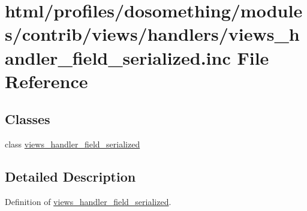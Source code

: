 \hypertarget{views__handler__field__serialized_8inc}{
\section{html/profiles/dosomething/modules/contrib/views/handlers/views\_\-handler\_\-field\_\-serialized.inc File Reference}
\label{views__handler__field__serialized_8inc}
}
\subsection*{Classes}
\begin{DoxyCompactItemize}
\item 
class \hyperlink{classviews__handler__field__serialized}{views\_\-handler\_\-field\_\-serialized}
\end{DoxyCompactItemize}


\subsection{Detailed Description}
Definition of \hyperlink{classviews__handler__field__serialized}{views\_\-handler\_\-field\_\-serialized}. 